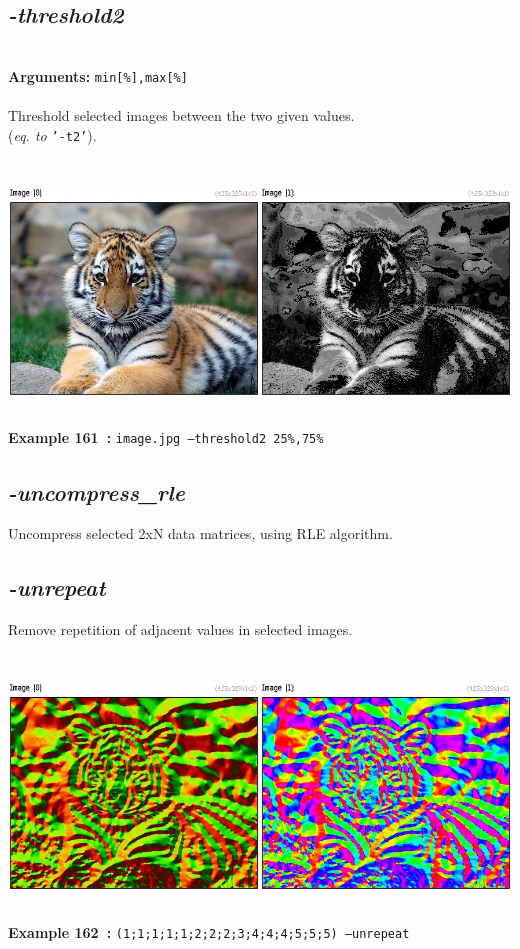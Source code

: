 \documentclass[a4paper,11pt,twoside]{book}
\begin{document}
\subsection{\emph{-threshold2} }\vspace*{-0.5em}
~\\\textbf{Arguments: } 
{\small \texttt{min[\%],max[\%]}}\\~\\
Threshold selected images between the two given values.
~\\(\emph{eq. to} {\small \texttt{'-t2'}}).
\begin{center}\includegraphics[keepaspectratio=true,height=7cm,width=\textwidth]{img/gmic_def161.jpg}\\
{\footnotesize \textbf{Example 161~:} \texttt{image.jpg --threshold2 25\%,75\%}}
\end{center}

\subsection{\emph{-uncompress\_rle} }\vspace*{-0.5em}
Uncompress selected 2xN data matrices, using RLE algorithm.


\subsection{\emph{-unrepeat} }\vspace*{-0.5em}
Remove repetition of adjacent values in selected images.
\begin{center}\includegraphics[keepaspectratio=true,height=7cm,width=\textwidth]{img/gmic_def162.jpg}\\
{\footnotesize \textbf{Example 162~:} \texttt{(1;1;1;1;1;2;2;2;3;4;4;4;5;5;5) --unrepeat}}
\end{center}
\end{document}
